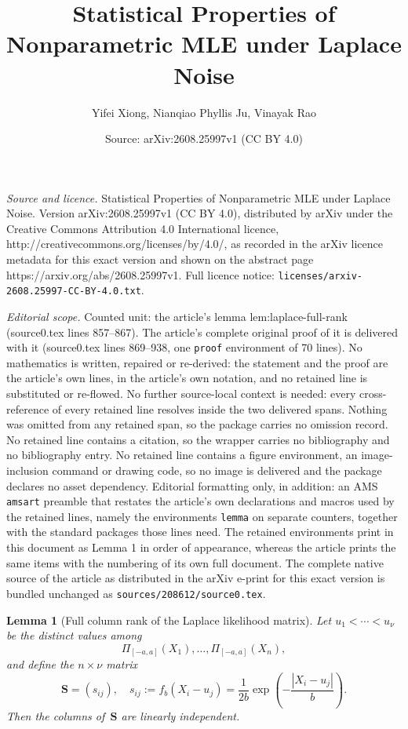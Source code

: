 \documentclass[10pt,a4paper]{amsart}
\title{Statistical Properties of Nonparametric MLE under Laplace Noise}
\author{Yifei Xiong, Nianqiao Phyllis Ju, Vinayak Rao}
\date{Source: arXiv:2608.25997v1 (CC BY 4.0)}
\newtheorem{lemma}{Lemma}
\begin{document}
\maketitle

\noindent\emph{Source and licence.} Statistical Properties of Nonparametric MLE under Laplace Noise. Version arXiv:2608.25997v1 (CC BY 4.0), distributed by arXiv under the Creative Commons Attribution 4.0 International licence, http://creativecommons.org/licenses/by/4.0/, as recorded in the arXiv licence metadata for this exact version and shown on the abstract page https://arxiv.org/abs/2608.25997v1. Full licence notice: \texttt{licenses/arxiv-2608.25997-CC-BY-4.0.txt}.\par\smallskip

\noindent\textit{Editorial scope.} Counted unit: the article's lemma lem:laplace-full-rank (source0.tex lines 857--867). The article's complete original proof of it is delivered with it (source0.tex lines 869--938, one \texttt{proof} environment of 70 lines). No mathematics is written, repaired or re-derived: the statement and the proof are the article's own lines, in the article's own notation, and no retained line is substituted or re-flowed.  No further source-local context is needed: every cross-reference of every retained line resolves inside the two delivered spans.  Nothing was omitted from any retained span, so the package carries no omission record.  No retained line contains a citation, so the wrapper carries no bibliography and no bibliography entry.  No retained line contains a figure environment, an image-inclusion command or drawing code, so no image is delivered and the package declares no asset dependency.  Editorial formatting only, in addition: an AMS \texttt{amsart} preamble that restates the article's own declarations and macros used by the retained lines, namely the environments \texttt{lemma} on separate counters, together with the standard packages those lines need.  The retained environments print in this document as Lemma 1 in order of appearance, whereas the article prints the same items with the numbering of its own full document.  The complete native source of the article as distributed in the arXiv e-print for this exact version is bundled unchanged as \texttt{sources/208612/source0.tex}.
\begin{lemma}[Full column rank of the Laplace likelihood matrix]\label{lem:laplace-full-rank}
Let $u_1<\cdots<u_\nu$ be the distinct values among
\begin{equation*}
\Pi_{[-a,a]}(X_1),\dots,\Pi_{[-a,a]}(X_n),
\end{equation*}
and define the $n\times \nu$ matrix
\begin{equation*}
\mathbf S=(s_{ij}),\quad s_{ij}:=f_b(X_i-u_j)=\frac{1}{2b}\exp\left(-\frac{|X_i-u_j|}{b}\right).
\end{equation*}
Then the columns of $\, \mathbf S$ are linearly independent.
\end{lemma}
\end{document}
